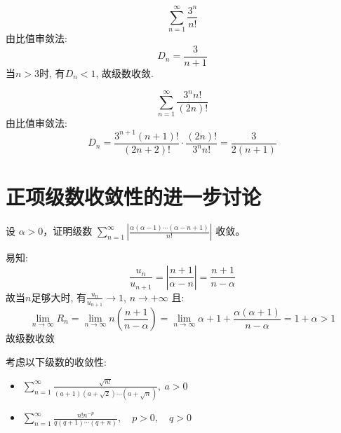 \[
    \sum_{n=1}^{\infty} \frac{3^n}{n!}
\]
由比值审敛法:
\[
    D_{n} = \frac{3}{n+1}
\]
当\(n>3\)时, 有\(D_{n} < 1\), 故级数收敛.

\[
    \sum_{n=1}^{\infty} \frac{3^{n}n!}{(2n)!}
\]
由比值审敛法:
\[
    D_{n} = \frac{3^{n+1}(n+1)!}{(2n+2)!} \cdot \frac{(2n)!}{3^{n}n!}
    = \frac{3}{2(n+1)}
\]

\section{正项级数收敛性的进一步讨论}

\begin{problem}
    设 \(\alpha > 0\)，证明级数 \(\sum_{n=1}^{\infty} \left|
    \frac{\alpha(\alpha - 1) \cdots (\alpha - n + 1)}{n!} \right| \) 收敛。
\end{problem}

\begin{solution}
    易知: \[
        \frac{u_{n}}{u_{n+1}}= \left| \frac{n+1}{\alpha-n} \right| =
        \frac{n+1}{n-\alpha}
    \]
    故当\(n\)足够大时, 有\(\frac{u_{n}}{u_{n+1}}\to 1\), \(n \to +\infty\)
    且:
    \[
        \lim_{n \to \infty} R_{n} = \lim_{n \to \infty} n \left(
        \frac{n+1}{n-\alpha} \right)
        =\lim_{n \to \infty} \alpha +1 +
        \frac{\alpha(\alpha+1)}{n-\alpha} = 1+\alpha > 1
    \]
    故级数收敛
\end{solution}

\begin{problem}
    考虑以下级数的收敛性:
    \begin{itemize}
        \item \(\sum_{n=1}^{\infty} \frac{\sqrt{n!}}{(a+1)(a+\sqrt{2}) \cdots
            (a+\sqrt{n})}, \ a > 0\)
        \item \(\sum_{n=1}^{\infty} \frac{n!n^{-p}}{q(q+1) \cdots (q+n)},
            \quad p > 0, \quad q > 0\)
    \end{itemize}
\end{problem}

